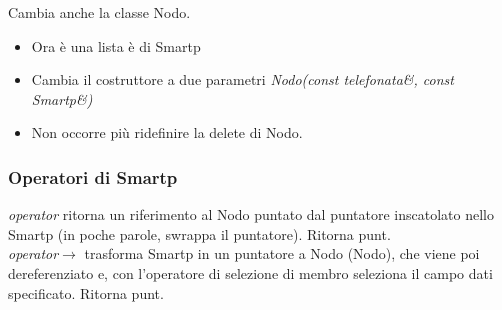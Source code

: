 Cambia anche la classe Nodo.

\begin{itemize}
	\item Ora è una lista è di Smartp
	\item Cambia il costruttore a due parametri \textit{Nodo(const telefonata\&, const Smartp\&)}
	\item Non occorre più ridefinire la delete di Nodo.
\end{itemize}

\subsubsection{Operatori di Smartp}

\textit{operator\textasteriskcentered} ritorna un riferimento al Nodo puntato dal puntatore inscatolato nello Smartp (in poche parole, swrappa il puntatore). Ritorna \textasteriskcentered punt.\\

\textit{operator$ \rightarrow $} trasforma Smartp in un puntatore a Nodo (Nodo\textasteriskcentered), che viene poi dereferenziato e, con l'operatore di selezione di membro seleziona il campo dati specificato. Ritorna punt.


